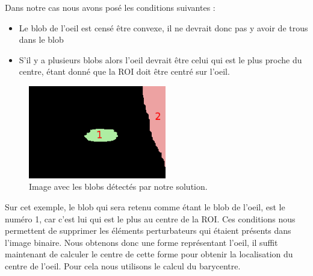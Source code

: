 Dans notre cas nous avons posé les conditions suivantes :
\begin{itemize}
 \item Le blob de l'oeil est censé être convexe, il ne devrait donc pas y avoir de trous dans le blob
 \item S'il y a plusieurs blobs alors l'oeil devrait être celui qui est le plus proche du centre, étant
 donné que la ROI doit être centré sur l'oeil.
\end{itemize}

\begin{figure}[H]
  \centering
  \includegraphics[width=6cm]{image/ycbcr_bin_open_blob.png}
  \caption{Image avec les blobs détectés par notre solution.}
\end{figure}

Sur cet exemple, le blob qui sera retenu comme étant le blob de l'oeil, est le numéro 1, car c'est lui
qui est le plus au centre de la ROI. Ces conditions nous permettent de supprimer les éléments perturbateurs qui étaient présents dans l'image binaire.
Nous obtenons donc une forme représentant l'oeil, il suffit maintenant de calculer le centre de cette forme
pour obtenir la localisation du centre de l'oeil. Pour cela nous utilisons le calcul du barycentre.